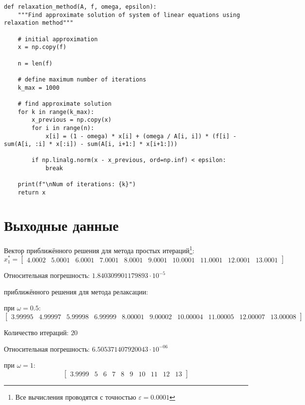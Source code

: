 \documentclass[12pt]{report}
\begin{document}
\begin{lstlisting}
def relaxation_method(A, f, omega, epsilon):
    """Find approximate solution of system of linear equations using relaxation method"""

    # initial approximation
    x = np.copy(f)

    n = len(f)

    # define maximum number of iterations
    k_max = 1000
    
    # find approximate solution
    for k in range(k_max):
        x_previous = np.copy(x)
        for i in range(n):
            x[i] = (1 - omega) * x[i] + (omega / A[i, i]) * (f[i] - sum(A[i, :i] * x[:i]) - sum(A[i, i+1:] * x[i+1:]))

        if np.linalg.norm(x - x_previous, ord=np.inf) < epsilon:
            break

    print(f"\nNum of iterations: {k}")
    return x
\end{lstlisting}

\section{Выходные данные}

Вектор приближённого решения для метода простых итераций\footnote{Все вычисления проводятся с точностью $\varepsilon = 0.0001$}:
\[x_{1}^* = 
\begin{bmatrix}
     4.0002 & 5.0001 & 6.0001 & 7.0001 & 8.0001 & 9.0001 & 10.0001 & 11.0001 & 12.0001 & 13.0001
\end{bmatrix}
\]

Относительная погрешность: $1.840309901179893 \cdot 10^{-5}$
\vspace{0.5cm}

 приближённого решения для метода релаксации:

при $\omega = 0.5$: 
\[\begin{bmatrix}
     3.99995 & 4.99997 & 5.99998 & 6.99999 & 8.00001 & 9.00002 & 10.00004 & 11.00005 & 12.00007 & 13.00008
\end{bmatrix}\]

Количество итераций: $20$

Относительная погрешность: $6.505371407920043 \cdot 10^{-06}$

\vspace{0.5cm}
при $\omega = 1$: 
\[\begin{bmatrix}
     3.9999 & 5 & 6 & 7 & 8 & 9 & 10 & 11 & 12 & 13
\end{bmatrix}\]
\end{document}
